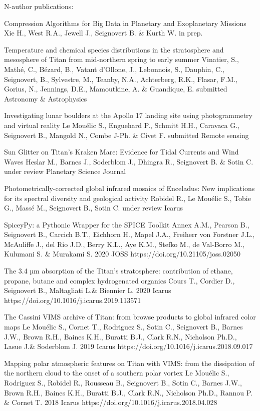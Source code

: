 \begin{cvpublications}{N-author publications:}

	{Compression Algorithms for Big Data in Planetary and Exoplanetary Missions}
	{Xie H., West R.A., Jewell J., Seignovert B. \& Kurth W.}
    {in prep.}
	{}
    {}

	{Temperature and chemical species distributions in the stratosphere and mesosphere of Titan from mid-northern spring to early summer}
	{Vinatier, S., Mathé, C., Bézard, B., Vatant d’Ollone, J., Lebonnois, S., Dauphin, C., Seignovert, B., Sylvestre, M., Teanby, N.A., Achterberg, R.K., Flasar, F.M., Gorius, N., Jennings, D.E., Mamoutkine, A. \& Guandique, E.}
    {submitted}
	{Astronomy \& Astrophysics}
    {}

	{Investigating lunar boulders at the Apollo 17 landing site using photogrammetry and virtual reality}
	{Le Mouélic S., Enguehard P., Schmitt H.H., Caravaca G., Seignovert B., Mangold N., Combe J-Ph. \& Civet F.}
	{submitted}
    {Remote sensing}
    {}

	{Sun Glitter on Titan's Kraken Mare: Evidence for Tidal Currents and Wind Waves}
	{Heslar M., Barnes J., Soderblom J., Dhingra R., Seignovert B. \& Sotin C.}
	{under review}
    {Planetary Science Journal}
    {}

	{Photometrically-corrected global infrared mosaics of Enceladus: New implications for its spectral diversity and geological activity}
	{Robidel R., Le Mouélic S., Tobie  G., Massé M., Seignovert B., Sotin C.}
	{under review}
    {Icarus}
    {}

	{SpiceyPy: a Pythonic Wrapper for the SPICE Toolkit}
	{Annex A.M., Pearson B., Seignovert B., Carcich B.T., Eichhorn H., Mapel J.A., Freiherr von Forstner J.L., McAuliffe J., del Rio J.D., Berry K.L., Aye K.M., Stefko M., de Val-Borro M., Kulumani S. \& Murakami S.}
	{2020}
    {JOSS}
    {https://doi.org/10.21105/joss.02050}

	{The 3.4 µm absorption of the Titan's stratosphere: contribution of ethane, propane, butane and complex hydrogenated organics}
	{Cours T., Cordier D., Seignovert B., Maltagliati L.\& Biennier L.}
	{2020}
    {Icarus}
    {https://doi.org/10.1016/j.icarus.2019.113571}

    {The Cassini VIMS archive of Titan: from browse products to global infrared color maps}
	{Le Mouélic S., Cornet T., Rodriguez S., Sotin C., Seignovert B., Barnes J.W., Brown R.H., Baines K.H., Buratti B.J., Clark R.N., Nicholson Ph.D., Lasue J.\& Soderblom J.}
	{2019}
    {Icarus}
    {https://doi.org/10.1016/j.icarus.2018.09.017}

    {Mapping polar atmospheric features on Titan with VIMS: from the dissipation of the northern cloud to the onset of a southern polar vortex}
	{Le Mouélic S., Rodriguez S., Robidel R., Rousseau B., Seignovert B., Sotin C., Barnes J.W., Brown R.H., Baines K.H., Buratti B.J., Clark R.N., Nicholson Ph.D., Rannou P. \& Cornet T.}
	{2018}
    {Icarus}
    {https://doi.org/10.1016/j.icarus.2018.04.028}


\end{cvpublications}
